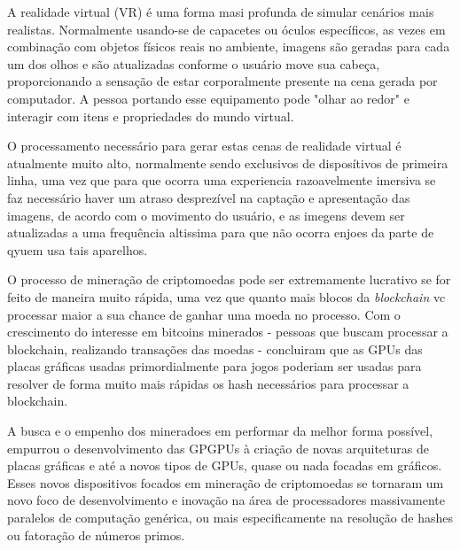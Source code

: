   A realidade virtual (VR) é uma forma masi profunda de simular cenários mais realistas. Normalmente usando-se de capacetes ou óculos específicos, as vezes em combinação com objetos físicos reais no ambiente, imagens são geradas para cada um dos olhos e são atualizadas conforme o usuário move sua cabeça, proporcionando a sensação de estar corporalmente presente na cena gerada por computador. A pessoa portando esse equipamento pode "olhar ao redor" e interagir com itens e propriedades do mundo virtual.

  O processamento necessário para gerar estas cenas de realidade virtual é atualmente muito alto, normalmente sendo exclusivos de disposítivos de primeira linha, uma vez que para que ocorra uma experiencia razoavelmente imersiva se faz necessário haver um atraso desprezível na captação e apresentação das imagens, de acordo com o movimento do usuário, e as imegens devem ser atualizadas a uma frequência altissima para que não ocorra enjoes da parte de qyuem usa tais aparelhos.

  O processo de mineração de criptomoedas pode ser extremamente lucrativo se for feito de maneira muito rápida, uma vez que quanto mais blocos da \textit{blockchain} vc processar maior a sua chance de ganhar uma moeda no processo. Com o crescimento do interesse em bitcoins minerados - pessoas que buscam processar a blockchain, realizando transações das moedas - concluiram que as GPUs das placas gráficas usadas primordialmente para jogos poderiam ser usadas para resolver de forma muito mais rápidas os hash necessários para processar a blockchain.


  A busca e o empenho dos mineradoes em performar da melhor forma possível, empurrou o desenvolvimento das GPGPUs à criação de novas arquiteturas de placas gráficas e até a novos tipos de GPUs, quase ou nada focadas em gráficos. Esses novos dispositivos focados em mineração de criptomoedas se tornaram um novo foco de desenvolvimento e inovação na área de processadores massivamente paralelos de computação genérica, ou mais especificamente na resolução de hashes ou fatoração de números primos.
